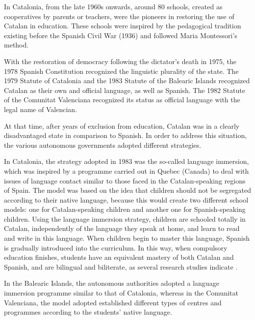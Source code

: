 \begin{multicols}{2}
In Catalonia, from the late 1960s onwards, around 80 schools, created as cooperatives by parents or teachers, were the pioneers in restoring the use of Catalan in education. These schools were inspired by the pedagogical tradition existing before the Spanish Civil War (1936) and followed Maria Montessori's method.

With the restoration of democracy following the dictator's death in 1975, the 1978 Spanish Constitution recognized the linguistic plurality of the state. The 1979 Statute of Catalonia and the 1983 Statute of the Balearic Islands recognized Catalan as their own and official language, as well as Spanish. The 1982 Statute of the Comunitat Valenciana recognized its status as official language with the legal name of Valencian.

At that time, after years of exclusion from education, Catalan was in a clearly disadvantaged state in comparison to Spanish. In order to address this situation, the various autonomous governments adopted different strategies.

In Catalonia, the strategy adopted in 1983 was the so-called language immersion, which was inspired by a programme carried out in Quebec (Canada) to deal with issues of language contact similar to those faced in the Catalan-speaking regions of Spain. The model was based on the idea that children should not be segregated according to their native language, because this would create two different school models: one for Catalan-speaking children and another one for Spanish-speaking children. Using the language immersion strategy, children are schooled totally in Catalan, independently of the language they speak at home, and learn to read and write in this language. When children begin to master this language, Spanish is gradually introduced into the curriculum. In this way, when compulsory education finishes, students have an equivalent mastery of both Catalan and Spanish, and are bilingual and biliterate, as several research studies indicate \cite{CAT-Nota5}.


In the Balearic Islands, the autonomous authorities adopted a language immersion programme similar to that of Catalonia, whereas in the Comunitat Valenciana, the model adopted established different types of centres and programmes according to the students' native language.


\end{multicols}
